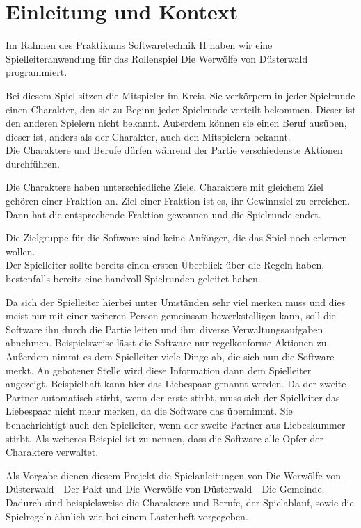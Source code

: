 \chapter{Einleitung und Kontext}

Im Rahmen des Praktikums Softwaretechnik II haben wir eine Spielleiteranwendung für das Rollenspiel \glqq Die Werwölfe von Düsterwald\grqq{} programmiert. 

\medskip
Bei diesem Spiel sitzen die Mitspieler im Kreis. Sie verkörpern in jeder Spielrunde einen Charakter, den sie zu Beginn jeder Spielrunde verteilt bekommen. Dieser ist den anderen Spielern nicht bekannt. Außerdem können sie einen Beruf ausüben, dieser ist, anders als der Charakter, auch den Mitspielern bekannt. \\
Die Charaktere und Berufe dürfen während der Partie verschiedenste Aktionen durchführen. 

\medskip
Die Charaktere haben unterschiedliche Ziele. Charaktere mit gleichem Ziel gehören einer Fraktion an. Ziel einer Fraktion ist es, ihr Gewinnziel zu erreichen. Dann hat die entsprechende Fraktion gewonnen und die Spielrunde endet. 

\medskip
Die Zielgruppe für die Software sind keine Anfänger, die das Spiel noch erlernen wollen. \\
Der Spielleiter sollte bereits einen ersten Überblick über die Regeln haben, bestenfalls bereits eine handvoll Spielrunden geleitet haben. 

\medskip
Da sich der Spielleiter hierbei unter Umständen sehr viel merken muss und dies meist nur mit einer weiteren Person gemeinsam bewerkstelligen kann, soll die Software ihn durch die Partie leiten und ihm diverse Verwaltungsaufgaben abnehmen. Beispielsweise lässt die Software nur regelkonforme Aktionen zu. Außerdem nimmt es dem Spielleiter viele Dinge ab, die sich nun die Software \glqq merkt\grqq{}. An gebotener Stelle wird diese Information dann dem Spielleiter angezeigt. Beispielhaft kann hier das Liebespaar genannt werden. Da der zweite Partner automatisch stirbt, wenn der erste stirbt, muss sich der Spielleiter das Liebespaar nicht mehr merken, da die Software das übernimmt. Sie benachrichtigt auch den Spielleiter, wenn der zweite Partner aus Liebeskummer stirbt. Als weiteres Beispiel ist zu nennen, dass die Software alle Opfer der Charaktere verwaltet. 

\medskip
Als Vorgabe dienen diesem Projekt die Spielanleitungen von \glqq Die Werwölfe von Düsterwald - Der Pakt\grqq{} und \glqq Die Werwölfe von Düsterwald - Die Gemeinde\grqq{}. Dadurch sind beispielsweise die Charaktere und Berufe, der Spielablauf, sowie die Spielregeln ähnlich wie bei einem Lastenheft vorgegeben. 

